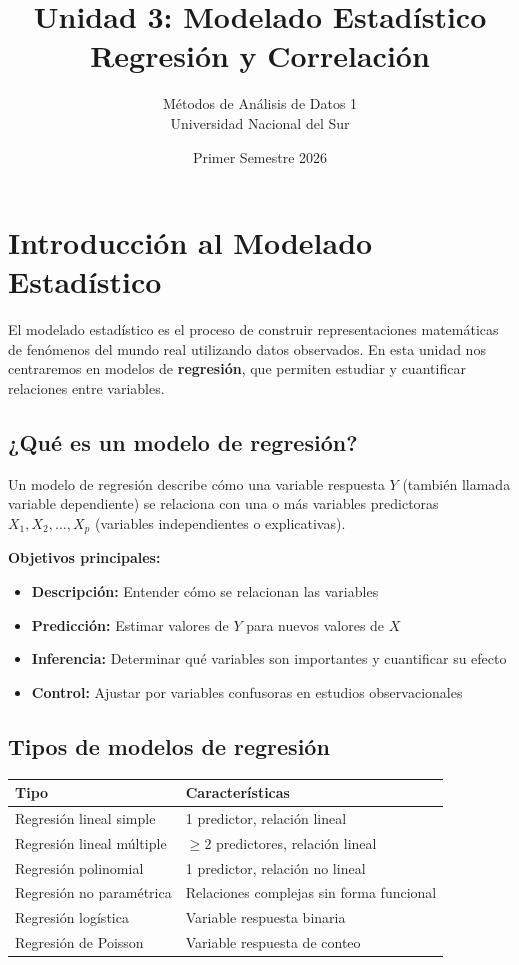 \documentclass[11pt,a4paper]{article}
\title{\textbf{Unidad 3: Modelado Estadístico}\\ \Large Regresión y Correlación}
\author{Métodos de Análisis de Datos 1\\Universidad Nacional del Sur}
\date{Primer Semestre 2026}
\begin{document}
\maketitle
\tableofcontents
\newpage

\section{Introducción al Modelado Estadístico}

El modelado estadístico es el proceso de construir representaciones matemáticas de fenómenos del mundo real utilizando datos observados. En esta unidad nos centraremos en modelos de \textbf{regresión}, que permiten estudiar y cuantificar relaciones entre variables.

\subsection{¿Qué es un modelo de regresión?}

Un modelo de regresión describe cómo una variable respuesta $Y$ (también llamada variable dependiente) se relaciona con una o más variables predictoras $X_1, X_2, \ldots, X_p$ (variables independientes o explicativas).

\textbf{Objetivos principales:}
\begin{itemize}
    \item \textbf{Descripción:} Entender cómo se relacionan las variables
    \item \textbf{Predicción:} Estimar valores de $Y$ para nuevos valores de $X$
    \item \textbf{Inferencia:} Determinar qué variables son importantes y cuantificar su efecto
    \item \textbf{Control:} Ajustar por variables confusoras en estudios observacionales
\end{itemize}

\subsection{Tipos de modelos de regresión}

\begin{table}[H]
\centering
\begin{tabular}{ll}
\toprule
\textbf{Tipo} & \textbf{Características} \\
\midrule
Regresión lineal simple & 1 predictor, relación lineal \\
Regresión lineal múltiple & $\geq 2$ predictores, relación lineal \\
Regresión polinomial & 1 predictor, relación no lineal \\
Regresión no paramétrica & Relaciones complejas sin forma funcional \\
Regresión logística & Variable respuesta binaria \\
Regresión de Poisson & Variable respuesta de conteo \\
\bottomrule
\end{tabular}
\end{table}
\end{document}
